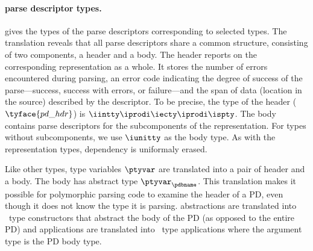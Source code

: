 {\paragraph*{\ddc{} parse descriptor types.}
 gives the types of the parse descriptors
corresponding to selected \ddc{} types.  The translation reveals that
all parse descriptors share a common structure, consisting of two
components, a header and a body.  The header reports on the
corresponding representation as a whole. It stores the number of
errors encountered during parsing, an error code indicating the degree
of success of the parse---success, success with errors, or
failure---and the span of data (location in the source)  
described by the descriptor.  To be precise, the type
of the header ($\tyface{pd\_hdr}$) is $\iintty \iprodi \iecty \iprodi
\ispty$. The body contains parse descriptors for the subcomponents of
the representation. For types without subcomponents, we use $\iunitty$
as the body type.  As with the representation types, dependency is
uniformaly erased.



Like other types, \ddc{} type variables $\ptyvar$ are translated into 
a pair of header and a body.  The body has abstract type 
$\ptyvar_\pdbname$.
This translation makes it possible for polymorphic parsing code to examine the
header of a PD, even though it does not know the \ddc{} type it is parsing.
\ddc{} abstractions are translated into \fomega\ type constructors that
abstract the body of the PD (as opposed to the entire PD)
and \ddc{} applications are translated into \fomega\ type applications
where the argument type is the PD body type.

}
